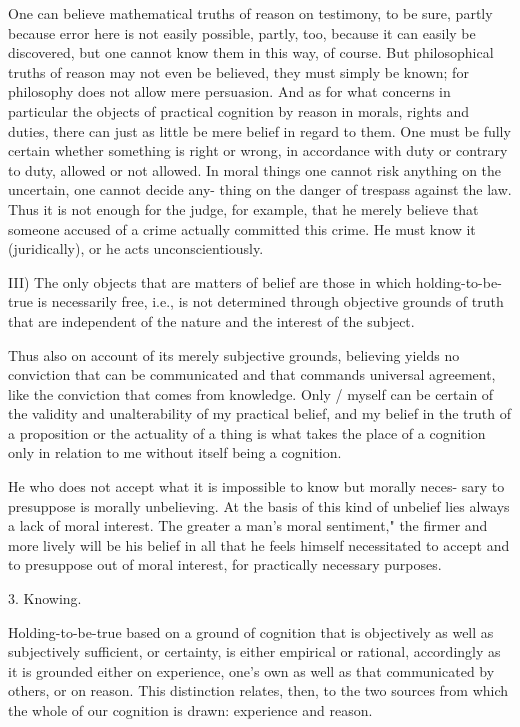 One can believe mathematical truths of reason on testimony, to be sure,
partly because error here is not easily possible, partly, too, because it can
easily be discovered, but one cannot know them in this way, of course. But
philosophical truths of reason may not even be believed, they must simply
be known; for philosophy does not allow mere persuasion. And as for
what concerns in particular the objects of practical cognition by reason in
morals, rights and duties, there can just as little be mere belief in regard to
them. One must be fully certain whether something is right or wrong, in
accordance with duty or contrary to duty, allowed or not allowed. In moral
things one cannot risk anything on the uncertain, one cannot decide any-
thing on the danger of trespass against the law. Thus it is not enough for the
judge, for example, that he merely believe that someone accused of a crime
actually committed this crime. He must know it (juridically), or he acts
unconscientiously.

III) The only objects that are matters of belief are those in which
holding-to-be-true is necessarily free, i.e., is not determined through
objective grounds of truth that are independent of the nature and the
interest of the subject.

Thus also on account of its merely subjective grounds, believing yields
no conviction that can be communicated and that commands universal
agreement, like the conviction that comes from knowledge. Only / myself
can be certain of the validity and unalterability of my practical belief, and
my belief in the truth of a proposition or the actuality of a thing is what
takes the place of a cognition only in relation to me without itself being a
cognition.

He who does not accept what it is impossible to know but morally neces-
sary to presuppose is morally unbelieving. At the basis of this kind of
unbelief lies always a lack of moral interest. The greater a man's moral
sentiment," the firmer and more lively will be his belief in all that he feels
himself necessitated to accept and to presuppose out of moral interest, for
practically necessary purposes.

3. Knowing.

Holding-to-be-true based on a ground of cognition that is
objectively as well as subjectively sufficient, or certainty, is
either empirical or rational, accordingly as it is grounded either
on experience, one's own as well as that communicated by others, or on reason.
This distinction relates, then, to the two sources from which
the whole of our cognition is drawn: experience and reason.

